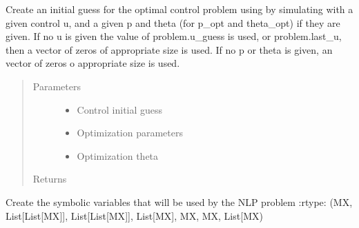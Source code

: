 \documentclass[letterpaper,10pt,english]{sphinxmanual}
\begin{document}
\begin{fulllineitems}
\begin{fulllineitems}
\label{\detokenize{yaocptool.methods.classic:yaocptool.methods.classic.multipleshooting.MultipleShootingScheme.create_initial_guess_with_simulation}}
Create an initial guess for the optimal control problem using by simulating with a given control u,
and a given p and theta (for p\_opt and theta\_opt) if they are given.
If no u is given the value of problem.u\_guess is used, or problem.last\_u, then a vector of zeros of appropriate
size is used.
If no p or theta is given, an vector of zeros o appropriate size is used.
\begin{quote}\begin{description}
\item[{Parameters}] \leavevmode\begin{itemize}
\item {} 
 \textendash{} Control initial guess

\item {} 
 \textendash{} Optimization parameters

\item {} 
 \textendash{} Optimization theta

\end{itemize}

\item[{Returns}] \leavevmode


\end{description}\end{quote}

\end{fulllineitems}


\begin{fulllineitems}
\label{\detokenize{yaocptool.methods.classic:yaocptool.methods.classic.multipleshooting.MultipleShootingScheme._create_nlp_symbolic_variables}}
Create the symbolic variables that will be used by the NLP problem
:rtype: (MX, List{[}List{[}MX{]}{]}, List{[}List{[}MX{]}{]}, List{[}MX{]}, MX, MX, List{[}MX)


\end{fulllineitems}
\end{fulllineitems}
\end{document}
